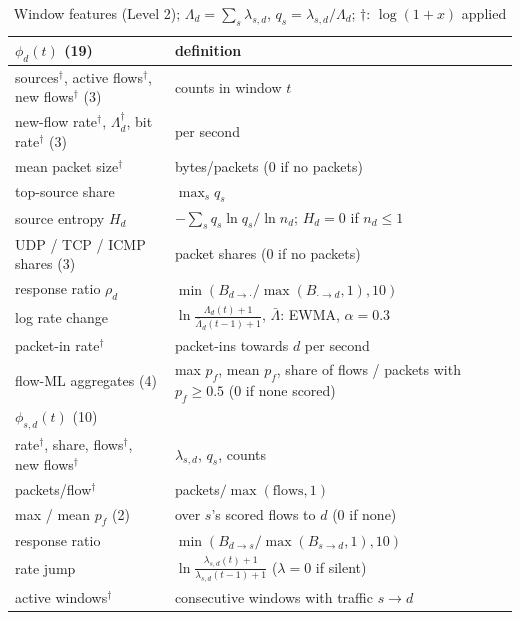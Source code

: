 \documentclass[conference]{IEEEtran}
\begin{document}
\begin{table}[t]
\caption{Window features (Level 2); $\Lambda_d=\sum_s\lambda_{s,d}$, $q_s=\lambda_{s,d}/\Lambda_d$; $\dagger$: $\log(1+x)$ applied}
\label{tab:feat}
\centering
\footnotesize
\setlength{\tabcolsep}{2.5pt}
\begin{tabular}{p{}p{}}
\toprule
$\phi_d(t)$ (19) & definition \\
\midrule
sources$^\dagger$, active flows$^\dagger$, new flows$^\dagger$ (3) & counts in window $t$ \\
new-flow rate$^\dagger$, $\Lambda_d^\dagger$, bit rate$^\dagger$ (3) & per second \\
mean packet size$^\dagger$ & bytes/packets (0 if no packets) \\
top-source share & $\max_s q_s$ \\
source entropy $H_d$ & $-\sum_s q_s\ln q_s/\ln n_d$; $H_d=0$ if $n_d\le1$ \\
UDP / TCP / ICMP shares (3) & packet shares (0 if no packets) \\
response ratio $\rho_d$ & $\min(B_{d\to\cdot}/\max(B_{\cdot\to d},1),10)$ \\
log rate change & $\ln\frac{\Lambda_d(t)+1}{\bar\Lambda_d(t-1)+1}$, $\bar\Lambda$: EWMA, $\alpha=0.3$ \\
packet-in rate$^\dagger$ & packet-ins towards $d$ per second \\
flow-ML aggregates (4) & max $p_f$, mean $p_f$, share of flows / packets with $p_f\ge0.5$ (0 if none scored) \\
\midrule
$\phi_{s,d}(t)$ (10) & \\
\midrule
rate$^\dagger$, share, flows$^\dagger$, new flows$^\dagger$ & $\lambda_{s,d}$, $q_s$, counts \\
packets/flow$^\dagger$ & packets$/\max(\text{flows},1)$ \\
max / mean $p_f$ (2) & over $s$'s scored flows to $d$ (0 if none) \\
response ratio & $\min(B_{d\to s}/\max(B_{s\to d},1),10)$ \\
rate jump & $\ln\frac{\lambda_{s,d}(t)+1}{\lambda_{s,d}(t-1)+1}$ ($\lambda=0$ if silent) \\
active windows$^\dagger$ & consecutive windows with traffic $s\to d$ \\
\bottomrule
\end{tabular}
\end{table}
\end{document}
